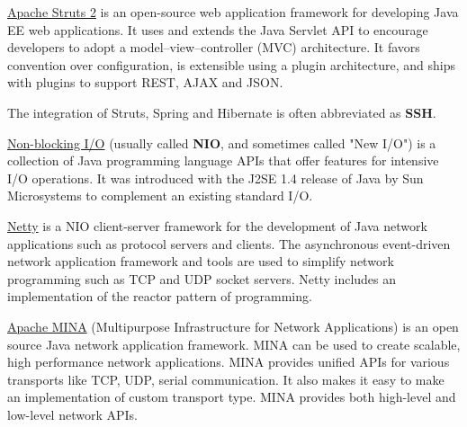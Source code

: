 \href{https://en.wikipedia.org/wiki/Apache_Struts_2}{Apache Struts 2} is an
open-source web application framework for developing Java EE web applications. 
It uses and extends the Java Servlet API to encourage developers to adopt a model–view–controller (MVC) architecture.
 It favors convention over configuration, is extensible using a plugin architecture, and ships with plugins to support REST, AJAX and JSON.

The integration of Struts, Spring and Hibernate is often abbreviated as
\textbf{SSH}.



\href{https://en.wikipedia.org/wiki/Non-blocking_I/O_(Java)}{Non-blocking I/O}
(usually called \textbf{NIO}, and sometimes called "New I/O") is a collection of
Java programming language APIs that offer features for intensive I/O operations.
It was introduced with the J2SE 1.4 release of Java by Sun Microsystems to complement an existing standard I/O.

\href{https://en.wikipedia.org/wiki/Netty_(software)}{Netty} is a NIO
client-server framework for the development of Java network applications such as protocol servers and clients. 
The asynchronous event-driven network application framework and tools are used to simplify network programming such as TCP and UDP socket servers.
Netty includes an implementation of the reactor pattern of programming.

\href{https://en.wikipedia.org/wiki/Apache_MINA}{Apache MINA} (Multipurpose
Infrastructure for Network Applications) is an open source Java network application framework. MINA can be used to create scalable, high performance network applications. 
MINA provides unified APIs for various transports like TCP, UDP, serial communication. 
It also makes it easy to make an implementation of custom transport type. 
MINA provides both high-level and low-level network APIs.










